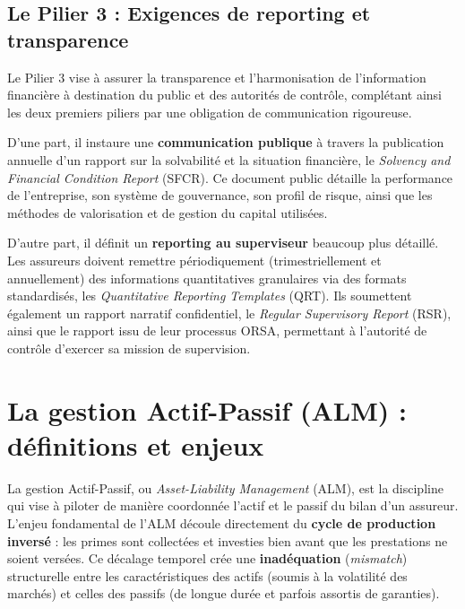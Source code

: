\subsection{Le Pilier 3 : Exigences de reporting et transparence}

Le Pilier 3 vise à assurer la transparence et l'harmonisation de l'information financière à destination du public et des autorités de contrôle, complétant ainsi les deux premiers piliers par une obligation de communication rigoureuse.

\bigskip

D'une part, il instaure une \textbf{communication publique} à travers la publication annuelle d'un rapport sur la solvabilité et la situation financière, le \textit{Solvency and Financial Condition Report} (SFCR). Ce document public détaille la performance de l'entreprise, son système de gouvernance, son profil de risque, ainsi que les méthodes de valorisation et de gestion du capital utilisées.

\bigskip

D'autre part, il définit un \textbf{reporting au superviseur} beaucoup plus détaillé. Les assureurs doivent remettre périodiquement (trimestriellement et annuellement) des informations quantitatives granulaires via des formats standardisés, les \textit{Quantitative Reporting Templates} (QRT). Ils soumettent également un rapport narratif confidentiel, le \textit{Regular Supervisory Report} (RSR), ainsi que le rapport issu de leur processus ORSA, permettant à l'autorité de contrôle d'exercer sa mission de supervision.

\section{La gestion Actif-Passif (ALM) : définitions et enjeux}
\label{sec:alm}

La gestion Actif-Passif, ou \textit{Asset-Liability Management} (ALM), est la discipline qui vise à piloter de manière coordonnée l'actif et le passif du bilan d'un assureur. L'enjeu fondamental de l'ALM découle directement du \textbf{cycle de production inversé} : les primes sont collectées et investies bien avant que les prestations ne soient versées. Ce décalage temporel crée une \textbf{inadéquation} (\textit{mismatch}) structurelle entre les caractéristiques des actifs (soumis à la volatilité des marchés) et celles des passifs (de longue durée et parfois assortis de garanties).

\bigskip

